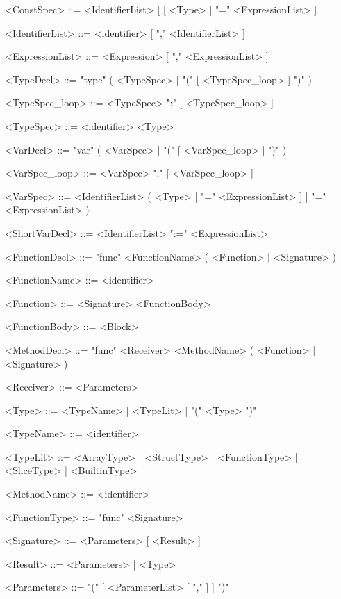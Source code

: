 \begin{grammar}
    <ConstSpec>         ::=     <IdentifierList> [ [ <Type> ] "=" <ExpressionList> ]

    <IdentifierList>    ::=     <identifier> [ "," <IdentifierList> ]


    <ExpressionList>    ::=     <Expression> [ "," <ExpressionList> ]

    <TypeDecl>          ::=     "type" ( <TypeSpec> | "(" [ <TypeSpec_loop> ] ")" )

    <TypeSpec_loop>     ::=     <TypeSpec> ";" [ <TypeSpec_loop> ]

    <TypeSpec>          ::=     <identifier> <Type>

    <VarDecl>           ::=     "var" ( <VarSpec> | "(" [ <VarSpec_loop> ] ")" )

    <VarSpec_loop>      ::=     <VarSpec> ";" [ <VarSpec_loop> ]

    <VarSpec>           ::=     <IdentifierList> ( <Type> [ "=" <ExpressionList> ] | "=" <ExpressionList> )

    <ShortVarDecl>      ::=     <IdentifierList> ":=" <ExpressionList>

    <FunctionDecl>      ::=     "func" <FunctionName> ( <Function> | <Signature> )

    <FunctionName>      ::=     <identifier>

    <Function>          ::=     <Signature> <FunctionBody>

    <FunctionBody>      ::=     <Block>

    <MethodDecl>          ::=     "func" <Receiver> <MethodName> ( <Function> | <Signature> )

    <Receiver>            ::=     <Parameters>


    <Type>              ::=     <TypeName> | <TypeLit> | "(" <Type> ")"

    <TypeName>          ::=     <identifier> 

    <TypeLit>           ::=     <ArrayType> | <StructType> 
                        |    <FunctionType> | <SliceType>
                        |    <BuiltinType>

    <MethodName>        ::=     <identifier>

    <FunctionType>      ::=     "func" <Signature>

    <Signature>         ::=     <Parameters> [ <Result> ]

    <Result>            ::=     <Parameters> | <Type>

    <Parameters>        ::=     "(" [ <ParameterList> [ "," ] ] ")"


\end{grammar}
